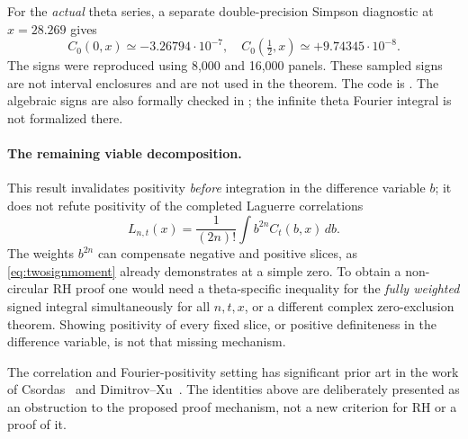 For the \emph{actual} theta series,
a separate double-precision Simpson
diagnostic at $x=28.269$ gives
\[
C_0(0,x)\simeq-3.26794\cdot10^{-7},
\quad
C_0(\tfrac12,x)\simeq+9.74345\cdot10^{-8}.
\]
The signs were reproduced using
8,000 and 16,000 panels. These sampled
signs are not interval enclosures and
are not used in the theorem.
The code is
.
The algebraic signs are also
formally checked in
;
the infinite theta Fourier integral
is not formalized there.

\paragraph{The remaining viable decomposition.}
This result invalidates positivity
\emph{before} integration in the
difference variable $b$; it does not
refute positivity of the completed
Laguerre correlations
\[
L_{n,t}(x)=\frac1{(2n)!}
\int b^{2n}C_t(b,x)\,db.
\]
The weights $b^{2n}$ can compensate
negative and positive slices,
as \eqref{eq:twosignmoment} already
demonstrates at a simple zero.
To obtain a non-circular RH proof one
would need a theta-specific inequality
for the \emph{fully weighted} signed
integral simultaneously for all
$n,t,x$, or a different complex
zero-exclusion theorem. Showing
positivity of every fixed slice,
or positive definiteness in the
difference variable, is not that
missing mechanism.

The correlation and Fourier-positivity
setting has significant prior art
in the work of Csordas~\cite{Cs}
and Dimitrov--Xu~\cite{DX}.
The identities above are deliberately
presented as an obstruction to the
proposed proof mechanism, not a
new criterion for RH or a proof of it.
